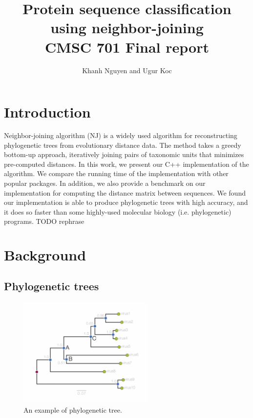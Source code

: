 \documentclass[11pt,letterpaper]{article}
\title{
Protein sequence classification using neighbor-joining\\
   CMSC 701 Final report
}
\author{
	Khanh Nguyen and Ugur Koc
}
\theoremstyle{definition}
\begin{document}
\maketitle

\section{Introduction}

Neighbor-joining algorithm (NJ) is a widely used algorithm for reconstructing phylogenetic trees from evolutionary distance data. The method takes a greedy bottom-up approach, iteratively joining pairs of taxonomic units that minimizes pre-computed distances. In this work, we present our C++ implementation of the algorithm. We compare the running time of the implementation with other popular packages. In addition, we also provide a benchmark on our implementation for computing the distance matrix between sequences. We found our implementation is able to produce phylogenetic trees with high accuracy, and it does so faster than some highly-used molecular biology (i.e. phylogenetic) programs. TODO rephrase

\section{Background}


\subsection{Phylogenetic trees}

\begin{figure}[h]
  \centering
  \includegraphics[width=0.6\textwidth]{phylogram_1a.png}
  \caption{An example of phylogenetic tree.}
  \label{fig:phytree}
\end{figure}
\end{document}
